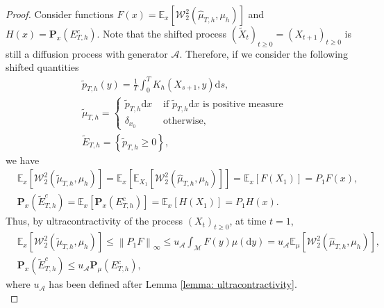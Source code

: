 \documentclass[10pt,a4paper]{article}
\newcommand{\E}{{\mathbb E}}
\renewcommand{\P}{{\mathbf P}}
\newcommand\cA{\mathcal{A}}
\newcommand\cM{\mathcal{M}}
\newcommand\cW{\mathcal{W}}
\newcommand\dd{\mathrm{d}}
\newcommand{\BRA}[1]{{{\left\{#1\right\}}}} %
\newcommand{\NRM}[1]{{{\left\| #1\right\|}}} %
\newcommand{\SBRA}[1]{{{\left[#1\right]}}} %
\begin{document}
\begin{proof}	
	Consider functions $F(x)= \E_x \SBRA{\cW_2^2( \widehat{\mu}_{T,h},\mu_h)}$ and $H(x) = \P_x(E^c_{T,h})$. 
	Note that the shifted process $(\widetilde{X}_t)_{t\ge 0}= (X_{t+1})_{t\ge 0}$ is still a diffusion process with generator $\cA$. Therefore, if we consider the following shifted quantities
 \begin{align*}
     &\widetilde{p}_{T,h}(y) =\frac{1}{T}\int_0^T K_h(X_{s+1},y)\dd s,\\
     & \widetilde{\mu}_{T,h} = \begin{cases}
     \widetilde{p}_{T,h} \dd x &\text{ if }\widetilde{p}_{T,h} \dd x\text{ is positive measure}\\[0.1cm]
     \delta_{x_0} &\text{ otherwise,}
     \end{cases} \\
     & \widetilde{E}_{T,h}=\BRA{ \widetilde{p}_{T,h} \ge 0},
 \end{align*}
 we have
	\begin{align*}
		&\mathbb{E}_{x}\left[ \cW^2_2( \widetilde{\mu}_{T,h},\mu_h) \right] = \mathbb{E}_{x} \left[\mathbb{E}_{X_1}\SBRA{ \cW^2_2(  \widehat{\mu}_{T,h},\mu_h)} \right]= \E_{x}\SBRA{F(X_1)}= P_1F(x),
  \\
  &\P_{x} (\widetilde{E}^c_{T,h} ) = \E_{x}\SBRA{ \P_x( E^c_{T,h})}= \E_{x}\SBRA{H(X_1)}=  P_1H(x).
\end{align*}
Thus, by ultracontractivity of the process $(X_t)_{t\ge 0}$, at time $t=1$,
\begin{align}
	&\mathbb{E}_{x}\left[ \cW^2_2(  \widetilde{\mu}_{T,h},\mu_h) \right] \le \NRM{P_1F}_{\infty} \le u_\cA \int_{\cM} F(y) \mu( \dd y) =u_\cA \E_{\mu} \SBRA{\cW^2_2( \widehat{\mu}_{T,h},\mu_h)},\label{ineq: contractivity 1}\\
 &\P_{x}( \widetilde{E}^c_{T,h}) \le u_\cA \P_{\mu}(E^c_{T,h}), \label{ineq: contractivity 2}
\end{align}where $u_\cA$ has been defined after Lemma \ref{lemma: ultracontractivity}.\\


\end{proof}
\end{document}
